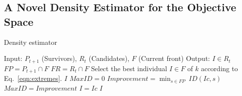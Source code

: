 %
%
%
%
%
%
%

%
%
%
%

\subsection{A Novel Density Estimator for the Objective Space}
\label{subsection:density}

\begin{algorithm}[t]
	\caption{Density estimator} 
\begin{small}
\begin{algorithmic}[1]
\STATE Input: $P_{t+1}$ (Survivors), $R_t$ (Candidates), $F$ (Current front)
    	\STATE Output: $I \in R_t$ 
	\STATE $FP = P_{t+1} \cap F$ \label{alg:FP}
	\STATE $FR = R_{t} \cap F$ \label{alg:FR}
        \label{alg:density_for}
	      \STATE Select the best individual $I \in F$ of $k$ according to Eq.~\ref{eqn:extremes}.\label{alg:density_1}
	  	 \RETURN $I$ \label{alg:density_2}
	  	\ENDIF
	\ENDFOR\label{alg:density_endfor}
	\STATE $MaxID = 0$ \label{alg:density_for2}
	\STATE $Improvement = \displaystyle{\min_{s \in FP}\ ID(Ic, s)}$ 
	 \label{alg:density_if2}
	   \STATE $MaxID = Improvement$
	   \STATE $I = Ic$ 
	\ENDIF \label{alg:density_endif2}
	\ENDFOR	\label{alg:density_endfor2}
    	\RETURN $I$ \label{alg:density_4}
	\end{algorithmic}
\end{small}
\label{alg:Density_Estimator}
\end{algorithm}

